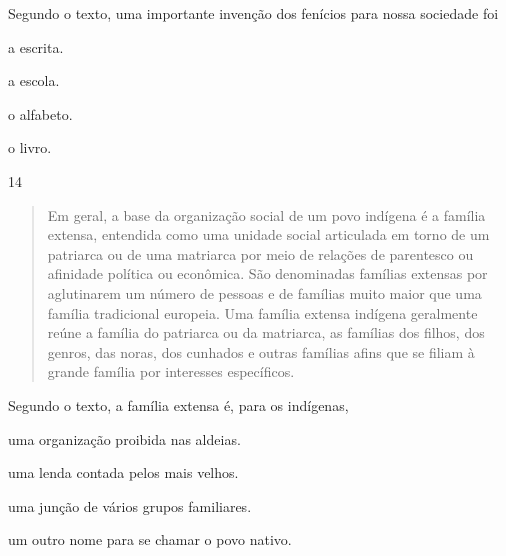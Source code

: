 Segundo o texto, uma importante invenção dos fenícios para nossa sociedade foi

\begin{minipage}{.5\textwidth}
\begin{escolha}
\item a escrita.

\item a escola.

\item o alfabeto.

\item o livro.
\end{escolha}
\end{minipage}


\num{14}

\begin{quote}
Em geral, a base da organização social de um povo indígena é a
família extensa, entendida como uma unidade social articulada em torno
de um patriarca ou de uma matriarca por meio de relações de parentesco
ou afinidade política ou econômica. São denominadas famílias extensas
por aglutinarem um número de pessoas e de famílias muito maior que uma
família tradicional europeia. Uma família extensa indígena geralmente
reúne a família do patriarca ou da matriarca, as famílias dos filhos,
dos genros, das noras, dos cunhados e outras famílias afins que se
filiam à grande família por interesses específicos.

\end{quote}

\pagebreak
\noindent{}Segundo o texto, a família extensa é, para os indígenas,

\begin{escolha}
\item uma organização proibida nas aldeias.

\item uma lenda contada pelos mais velhos.

\item uma junção de vários grupos familiares.

\item um outro nome para se chamar o povo nativo.
\end{escolha}

